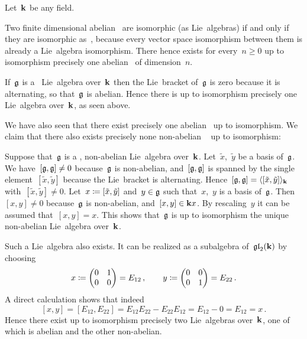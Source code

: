 \begin{example}
  Let~$\kf$ be any field.
  
  Two finite dimensional abelian~{\liealgebras{$\kf$}} are isomorphic (as Lie~algebras) if and only if they are isomorphic as~{\vectorspaces{$\kf$}}, because every vector space isomorphism between them is already a Lie~algebra isomorphism.
  There hence exists for every~$n \geq 0$ up to isomorphism precisely one abelian~{\liealgebra{$\kf$}} of dimension~$n$.
  
  If~$\mathfrak{g}$ is a~{\onedimensional} Lie~algebra over~$\kf$ then the Lie~bracket of~$\mathfrak{g}$ is zero because it is alternating, so that~$\mathfrak{g}$ is abelian.
  Hence there is up to isomorphism precisely one {\onedimensional} Lie~algebra over~$\kf$, as seen above.
  
  We have also seen that there exist precisely one {\twodimensional} abelian~{\liealgebra{$\kf$}} up to isomorphism.
  We claim that there also exists precisely none non-abelian {\twodimensional}~{\liealgebra{$\kf$}} up to isomorphism:
  
  Suppose that~$\mathfrak{g}$ is a {\twodimensional}, non-abelian Lie~algebra over~$\kf$.
  Let~$\tilde{x}$,~$\tilde{y}$ be a basis of~$\mathfrak{g}$.
  We have~$[\mathfrak{g},\mathfrak{g}] \neq 0$ because~$\mathfrak{g}$ is non-abelian, and~$[\mathfrak{g}, \mathfrak{g}]$ is spanned by the single element~$[\tilde{x}, \tilde{y}]$ because the Lie~bracket is alternating.
  Hence~$[\mathfrak{g}, \mathfrak{g}] = \langle [\tilde{x}, \tilde{y}] \rangle_{\mathbf{k}}$ with~$[\tilde{x}, \tilde{y}] \neq 0$.
  Let~$x \coloneqq [\tilde{x},\tilde{y}]$ and~$y \in \mathfrak{g}$ such that~$x$,~$y$ is a basis of~$\mathfrak{g}$.
  Then~$[x,y] \neq 0$ because~$\mathfrak{g}$ is non-abelian, and~$[x,y] \in \mathbf{k} x$.
  By rescaling~$y$ it can be assumed that~$[x,y] = x$.
 This shows that~$\mathfrak{g}$ is up to isomorphism the unique {\twodimensional} non-abelian Lie~algebra over~$\kf$.
 
  Such a Lie~algebra also exists.
  It can be realized as a subalgebra of~$\mathfrak{gl}_2(\mathbf{k})$ by choosing
  \[
    x
    \coloneqq
    \begin{pmatrix}
      0 & 1 \\
      0 & 0
    \end{pmatrix}
    =
    E_{12}  \,,
    \qquad
    y
    \coloneqq
    \begin{pmatrix}
      0 & 0 \\
      0 & 1
    \end{pmatrix}
    =
    E_{22}  \,.
  \]
  A direct calculation shows that indeed
  \[
    [x,y]
    =
    [E_{12}, E_{22}]
    =
    E_{12} E_{22} - E_{22} E_{12}
    =
    E_{12} - 0
    =
    E_{12}
    =
    x \,.
  \]
  Hence there exist up to isomorphism precisely two {\twodimensional} Lie~algebras over~$\kf$, one of which is abelian and the other non-abelian.
\end{example}


